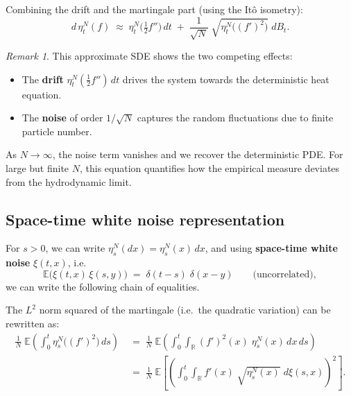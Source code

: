 \documentclass[11pt]{article}
\theoremstyle{definition}
\theoremstyle{remark}
\newtheorem{remark}{Remark}
\begin{document}

Combining the drift and the martingale part
(using the Itô isometry):
\[
    d\,\eta_t^N(f)
    \;\approx\;
    \eta_t^N\!\bigl(\tfrac{1}{2}f''\bigr)\,dt
    \;+\;
    \frac{1}{\sqrt{N}}\;
    \sqrt{\eta_t^N\!\bigl((f')^2\bigr)}\;dB_t.
\]

\begin{remark}
This approximate SDE shows the two competing effects:
\begin{itemize}
    \item The \textbf{drift} $\eta_t^N(\tfrac{1}{2}f'')\,dt$ drives
          the system towards the deterministic heat equation.
    \item The \textbf{noise} of order $1/\sqrt{N}$ captures the
          random fluctuations due to finite particle number.
\end{itemize}
As $N \to \infty$, the noise term vanishes and we recover the
deterministic PDE.  For large but finite $N$, this equation
quantifies how the empirical measure deviates from the
hydrodynamic limit.
\end{remark}

\subsection*{Space-time white noise representation}


For $s > 0$, we can write $\eta_s^N(dx) = \eta_s^N(x)\,dx$,
and using \textbf{space-time white noise} $\xi(t,x)$,
i.e.\
\[
    \mathbb{E}\!\bigl(\xi(t,x)\,\xi(s,y)\bigr)
    \;=\;
    \delta(t - s)\;\delta(x - y)
    \qquad \text{(uncorrelated)},
\]
we can write the following chain of equalities.


The $L^2$ norm squared of the martingale
(i.e.\ the quadratic variation) can be rewritten as:
\begin{align*}
    \frac{1}{N}\;
    \mathbb{E}\!\left(
        \int_0^t \eta_s^N\!\bigl((f')^2\bigr)\,ds
    \right)
    &\;=\;
    \frac{1}{N}\;
    \mathbb{E}\!\left(
        \int_0^t \!\!\int_{\mathbb{R}}
        (f')^2(x)\;\eta_s^N(x)\,dx\,ds
    \right) \\[10pt]
    &\;=\;
    \frac{1}{N}\;
    \mathbb{E}\!\left[
        \left(
            \int_0^t \!\!\int_{\mathbb{R}}
            f'(x)\;\sqrt{\eta_s^N(x)}\;
            d\xi(s, x)
        \right)^{\!2}
    \right].
\end{align*}
\end{document}
